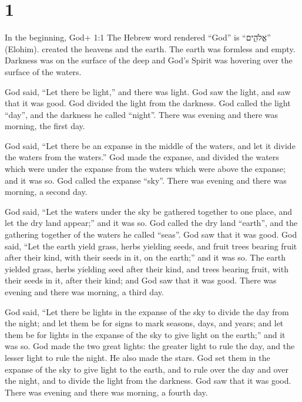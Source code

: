 \hypertarget{section}{%
\section{1}\label{section}}

 In the beginning, God+ 1:1 The Hebrew word rendered ``God''
is ``אֱלֹהִ֑ים'' (Elohim). created the heavens and the earth.
 The earth was formless and empty. Darkness was on the
surface of the deep and God's Spirit was hovering over the surface of
the waters.

 God said, ``Let there be light,'' and there was light.
 God saw the light, and saw that it was good. God divided
the light from the darkness.  God called the light ``day'',
and the darkness he called ``night''. There was evening and there was
morning, the first day.

 God said, ``Let there be an expanse in the middle of the
waters, and let it divide the waters from the waters.''  God
made the expanse, and divided the waters which were under the expanse
from the waters which were above the expanse; and it was so.
 God called the expanse ``sky''. There was evening and there
was morning, a second day.

 God said, ``Let the waters under the sky be gathered
together to one place, and let the dry land appear;'' and it was so.
 God called the dry land ``earth'', and the gathering
together of the waters he called ``seas''. God saw that it was good.
 God said, ``Let the earth yield grass, herbs yielding
seeds, and fruit trees bearing fruit after their kind, with their seeds
in it, on the earth;'' and it was so.  The earth yielded
grass, herbs yielding seed after their kind, and trees bearing fruit,
with their seeds in it, after their kind; and God saw that it was good.
 There was evening and there was morning, a third day.

 God said, ``Let there be lights in the expanse of the sky
to divide the day from the night; and let them be for signs to mark
seasons, days, and years;  and let them be for lights in
the expanse of the sky to give light on the earth;'' and it was so.
 God made the two great lights: the greater light to rule
the day, and the lesser light to rule the night. He also made the stars.
 God set them in the expanse of the sky to give light to
the earth,  and to rule over the day and over the night,
and to divide the light from the darkness. God saw that it was good.
 There was evening and there was morning, a fourth day.

